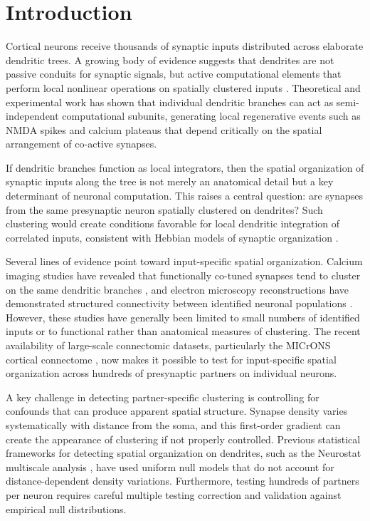\section{Introduction}

Cortical neurons receive thousands of synaptic inputs distributed across elaborate dendritic trees. A growing body of evidence suggests that dendrites are not passive conduits for synaptic signals, but active computational elements that perform local nonlinear operations on spatially clustered inputs \citep{poirazi2003,branco2010branch,major2013}. Theoretical and experimental work has shown that individual dendritic branches can act as semi-independent computational subunits, generating local regenerative events such as NMDA spikes \citep{schiller2000} and calcium plateaus \citep{larkum2022} that depend critically on the spatial arrangement of co-active synapses.

If dendritic branches function as local integrators, then the spatial organization of synaptic inputs along the tree is not merely an anatomical detail but a key determinant of neuronal computation. This raises a central question: are synapses from the same presynaptic neuron spatially clustered on dendrites? Such clustering would create conditions favorable for local dendritic integration of correlated inputs, consistent with Hebbian models of synaptic organization \citep{kleindienst2011,takahashi2012}.

Several lines of evidence point toward input-specific spatial organization. Calcium imaging studies have revealed that functionally co-tuned synapses tend to cluster on the same dendritic branches \citep{wilson2016,jia2010}, and electron microscopy reconstructions have demonstrated structured connectivity between identified neuronal populations \citep{druckmann2014,kasthuri2015}. However, these studies have generally been limited to small numbers of identified inputs or to functional rather than anatomical measures of clustering. The recent availability of large-scale connectomic datasets, particularly the MICrONS cortical connectome \citep{microns2025}, now makes it possible to test for input-specific spatial organization across hundreds of presynaptic partners on individual neurons.

A key challenge in detecting partner-specific clustering is controlling for confounds that can produce apparent spatial structure. Synapse density varies systematically with distance from the soma, and this first-order gradient can create the appearance of clustering if not properly controlled. Previous statistical frameworks for detecting spatial organization on dendrites, such as the Neurostat multiscale analysis \citep{neurostat}, have used uniform null models that do not account for distance-dependent density variations. Furthermore, testing hundreds of partners per neuron requires careful multiple testing correction and validation against empirical null distributions.

